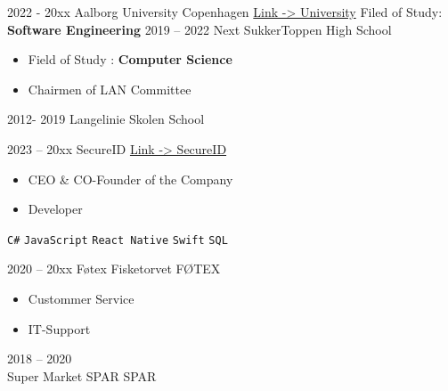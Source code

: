 \documentclass[9pt]{developercv} %
\begin{document}
\vspace{-10 pt}
\begin{entrylist}
    \entry
		{2022 - 20xx}
		{Aalborg University Copenhagen}
		{\href{https://www.aau.dk/uddannelser/bachelor/software-koebenhavn}{Link -> University}}
		{Filed of Study: \textbf{Software Engineering}}
    \entry
		{2019 -- 2022}
		{Next SukkerToppen}
		{High School}
		{\vspace{-10pt}
        \begin{itemize}[noitemsep,topsep=0pt,parsep=0pt,partopsep=0pt, leftmargin=-1pt]
            \item{Field of Study : \textbf{Computer Science}}
            \item{Chairmen of LAN Committee}
        \end{itemize} 
        \texttt{}\texttt{}}
	\entry
		{2012- 2019}
		{Langelinie Skolen}
		{School}
		{}
\end{entrylist}

\vspace{-10 pt}
\begin{entrylist}
	\entry
        {2023 -- 20xx}
		{SecureID}
		{\href{https://secureid.dk/}{Link -> SecureID}}
		{\vspace{-10pt}
        \begin{itemize}[noitemsep,topsep=0pt,parsep=0pt,partopsep=0pt, leftmargin=-1pt]
            \item{CEO \& CO-Founder of the Company}
            \item{Developer}
        \end{itemize} 
        \texttt{C\#} \slashsep \texttt{JavaScript} \slashsep \texttt{React Native} \slashsep \texttt{Swift} \slashsep \texttt{SQL}}
	\entry
		{2020 -- 20xx}
		{Føtex Fisketorvet}
		{FØTEX}
		{\vspace{-10pt}
        \begin{itemize}[noitemsep,topsep=0pt,parsep=0pt,partopsep=0pt, leftmargin=-1pt]
            \item{Custommer Service}
            \item{IT-Support}
        \end{itemize} 
        \texttt{}\texttt{}}
	\entry
		{2018 -- 2020 \\\footnotesize{Super Market}}
		{SPAR}
		{SPAR}
		{\vspace{-10pt}}
\end{entrylist}
\end{document}
